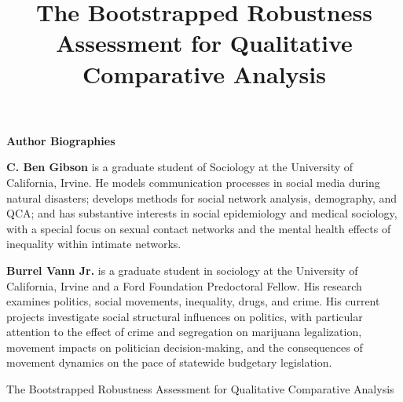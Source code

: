 \documentclass[12pt]{article}
\title{{The Bootstrapped Robustness Assessment for Qualitative Comparative Analysis}}
\begin{document}
\maketitle
\doublespace
\newpage
{{{\normalsize{\begin{center}\begin{singlespace}{\textbf{Author Biographies}}\end{singlespace}\end{center}}}}
\vspace{12pt}
\vspace{12pt}
{{{\normalsize{\begin{singlespace}
{\textbf{C. Ben Gibson}} is a graduate student of Sociology at the University of California, Irvine. He models communication processes in social media during natural disasters; develops methods for social network analysis, demography, and QCA; and has substantive interests in social epidemiology and medical sociology, with a special focus on sexual contact networks and the mental health effects of inequality within intimate networks. 
\end{singlespace}}}}
\vspace{12pt}
{{{\normalsize{\begin{singlespace}
{\textbf{Burrel Vann Jr.}} is a graduate student in sociology at the University of California, Irvine and a Ford Foundation Predoctoral Fellow. His research examines politics, social movements, inequality, drugs, and crime. His current projects investigate social structural influences on politics, with particular attention to the effect of crime and segregation on marijuana legalization, movement impacts on politician decision-making, and the consequences of movement dynamics on the pace of statewide budgetary legislation. 
\end{singlespace}}}}


\newpage

{{
{\LARGE{\begin{center}\begin{singlespace}The Bootstrapped Robustness Assessment for Qualitative Comparative Analysis\end{singlespace}\end{center}}}}


}}}}
\end{document}
